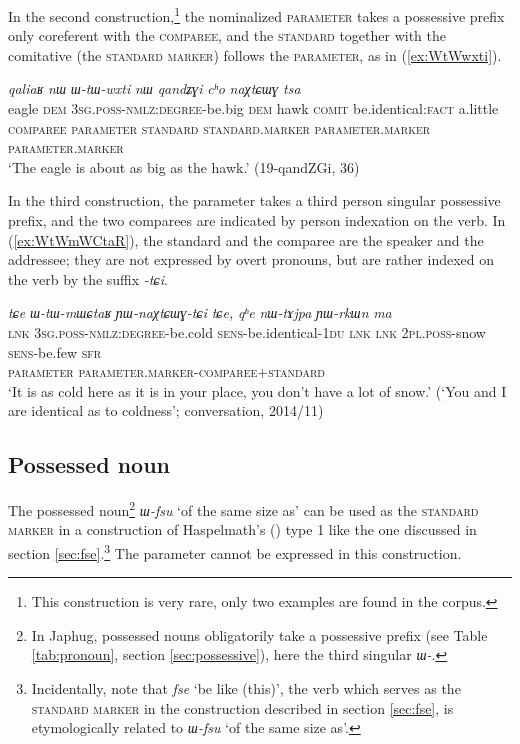 \documentclass[oneside,a4paper,11pt]{article}
\newcommand{\ipa}[1]{{\phon\textit{#1}}}
\newcommand{\forme}[2]{\ipa{#1} `#2'}
\begin{document}
In the second construction,\footnote{This construction is very rare, only two examples are found in the corpus.} the nominalized \textsc{parameter} takes a possessive prefix only coreferent with the \textsc{comparee}, and the \textsc{standard}  together with the comitative (the \textsc{standard marker}) follows the \textsc{parameter}, as in (\ref{ex:WtWwxti}).

\begin{exe}
\ex \label{ex:WtWwxti}
\glll
\ipa{qaliaʁ} 	\ipa{nɯ} 	\ipa{ɯ-tɯ-wxti} 	\ipa{nɯ} 	\ipa{qandʑɣi} 	\ipa{cʰo} 	\ipa{naχtɕɯɣ} 	\ipa{tsa} 	\\
eagle \textsc{dem} \textsc{3sg.poss-nmlz:degree}-be.big \textsc{dem} hawk \textsc{comit} be.identical:\textsc{fact} a.little  \\
{\textsc{comparee}} { } \textsc{parameter} { } {\textsc{standard}} \textsc{standard.marker} \textsc{parameter.marker}  \textsc{parameter.marker} \\
\glt `The eagle is about as big as the hawk.' (19-qandZGi, 36)
\end{exe}

In the third construction, the parameter takes a third person singular possessive prefix, and the two comparees are indicated by person indexation on the verb. In (\ref{ex:WtWmWCtaR}), the standard and the comparee are the speaker and the addressee; they are not expressed by overt pronouns, but are rather indexed on the verb by the suffix \ipa{-tɕi}.

\begin{exe}
\ex \label{ex:WtWmWCtaR}
\glll
\ipa{tɕe} 	\ipa{ɯ-tɯ-mɯɕtaʁ} 	\ipa{ɲɯ-naχtɕɯɣ-tɕi} 	\ipa{tɕe,} 	\ipa{qʰe} 	\ipa{nɯ-tɤjpa} 	\ipa{ɲɯ-rkɯn} 	\ipa{ma} \\
\textsc{lnk} \textsc{3sg.poss-nmlz:degree}-be.cold \textsc{sens}-be.identical-\textsc{1du} \textsc{lnk} \textsc{lnk} \textsc{2pl.poss}-snow \textsc{sens}-be.few \textsc{sfr} \\
{ } \textsc{parameter} \textsc{parameter.marker-comparee+standard} \\
\glt `It is as cold here as it is in your place, you don't have a lot of snow.' (`You and I are identical as to coldness'; conversation, 2014/11)
\end{exe}



\subsection{Possessed noun} \label{sec:Wfsu}
The possessed noun\footnote{In Japhug, possessed nouns obligatorily take a possessive prefix (see Table \ref{tab:pronoun}, section \ref{sec:possessive}), here the third singular \ipa{ɯ-}. } \forme{ɯ-fsu}{of the same size as} can be used as the \textsc{standard marker} in a construction of Haspelmath's (\citeyear{haspelmath17equative}) type 1 like the one discussed in section \ref{sec:fse}.\footnote{Incidentally, note that \forme{fse}{be like (this)}, the verb which serves as the \textsc{standard marker} in the construction described in section \ref{sec:fse}, is etymologically related to \forme{ɯ-fsu}{of the same size as}.} The parameter cannot be expressed in this construction.
\end{document}
